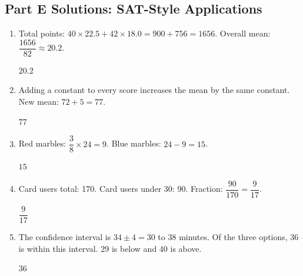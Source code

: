 \documentclass[14pt]{extarticle}
\begin{document}
\subsection*{Part E Solutions: SAT-Style Applications}
\begin{enumerate}
  \item Total points: \(40 \times 22.5 + 42 \times 18.0 = 900 + 756 = 1656\). Overall mean: \(\dfrac{1656}{82} \approx 20.2\).

  \(\boxed{20.2}\)

  \item Adding a constant to every score increases the mean by the same constant. New mean: \(72 + 5 = 77\).

  \(\boxed{77}\)

  \item Red marbles: \(\dfrac{3}{8} \times 24 = 9\). Blue marbles: \(24 - 9 = 15\).

  \(\boxed{15}\)

  \item Card users total: 170. Card users under 30: 90. Fraction: \(\dfrac{90}{170} = \dfrac{9}{17}\).

  \(\boxed{\dfrac{9}{17}}\)

  \item The confidence interval is \(34 \pm 4 = 30\) to \(38\) minutes. Of the three options, 36 is within this interval. 29 is below and 40 is above.

  \(\boxed{36}\)
\end{enumerate}

\end{document}

